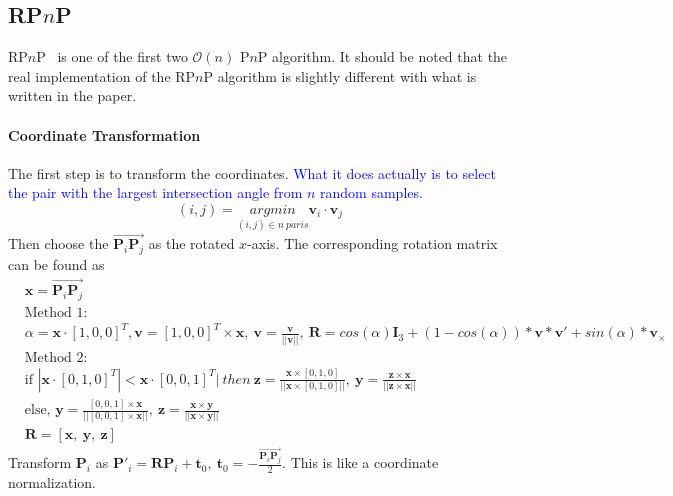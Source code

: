 \documentclass[a4paper]{report}
\begin{document}
\subsection{RP$n$P}
RP$n$P~\cite{li2012robust} is one of the first two $\mathcal{O}(n)$ P$n$P algorithm. It should be noted that the real implementation of the RP$n$P algorithm is slightly different with what is written in the paper. 
\paragraph{Coordinate Transformation}
The first step is to transform the coordinates. \textcolor{blue}{What it does actually is to select the pair with the largest intersection angle from $n$ random samples.}
$$
(i,j)=\underset{(i,j) \in n\ paris}{argmin}{\mathbf{v}_i \cdot \mathbf{v}_j}
$$
Then choose the $\overrightarrow{\mathbf{P}_i\mathbf{P}_j}$ as the rotated $x$-axis. The corresponding rotation matrix can be found as
\begin{align*}
&\mathbf{x} = \overrightarrow{\mathbf{P}_i\mathbf{P}_j} \\
&\text{Method 1}:\\
&\alpha = \mathbf{x} \cdot [1,0,0]^T, \mathbf{v} = [1,0,0]^T \times \mathbf{x},\ \mathbf{v} = \frac{\mathbf{v}}{||\mathbf{v}||},\ \mathbf{R}=cos(\alpha)\mathbf{I}_3 + (1 - cos(\alpha)) * \mathbf{v} * \mathbf{v}' + sin(\alpha) * \mathbf{v}_{\times} \\
&\text{Method 2}:\\
&\text{if } |\mathbf{x} \cdot [0,1,0]^T| < \mathbf{x} \cdot [0,0,1]^T|\ then\  \mathbf{z} = \frac{\mathbf{x} \times [0,1,0]}{||\mathbf{x} \times [0,1,0]||},\ \mathbf{y}=\frac{\mathbf{z} \times \mathbf{x}}{||\mathbf{z} \times \mathbf{x}||} \\
& \text{else, } \mathbf{y} = \frac{[0,0,1] \times \mathbf{x}}{||[0,0,1] \times \mathbf{x}||},\ \mathbf{z}=\frac{\mathbf{x} \times \mathbf{y}}{||\mathbf{x} \times \mathbf{y}||} \\
&\mathbf{R}=[\mathbf{x},\ \mathbf{y},\ \mathbf{z}]
\end{align*}
Transform $\mathbf{P}_i$ as $\mathbf{P}'_i = \mathbf{RP}_i+\mathbf{t}_0,\ \mathbf{t}_0=-\frac{\overrightarrow{\mathbf{P}_i\mathbf{P}_j}}{2}$. This is like a coordinate normalization.
\end{document}
